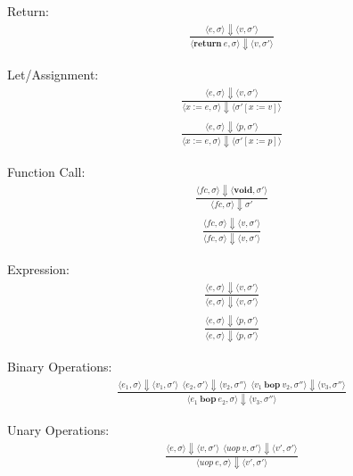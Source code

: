 \documentclass[12pt]{article}
\begin{document}
	Return:
	\begin{align*}
		\frac{\langle e, \sigma \rangle\Downarrow \langle v, \sigma' \rangle}
		{\langle \textbf{return}\ e, \sigma \rangle\Downarrow \langle v, \sigma' \rangle}
	\end{align*}

	Let/Assignment:
	\begin{align*}
		\frac{\langle e, \sigma \rangle\Downarrow \langle v, \sigma' \rangle}
		{\langle x := e, \sigma \rangle\Downarrow \langle \sigma' [x := v] \rangle}
	\end{align*}
	\begin{align*}
		\frac{\langle e, \sigma \rangle\Downarrow \langle p, \sigma' \rangle}
		{\langle x := e, \sigma \rangle\Downarrow \langle \sigma' [x := p] \rangle}
	\end{align*}

	Function Call:
	\begin{align*}
		\frac{\langle fc, \sigma \rangle\Downarrow \langle \textbf{void}, \sigma' \rangle}
		{\langle fc, \sigma \rangle\Downarrow \sigma'}
	\end{align*}
	\begin{align*}
		\frac{\langle fc, \sigma \rangle\Downarrow \langle v, \sigma' \rangle}
		{\langle fc, \sigma \rangle\Downarrow \langle v, \sigma' \rangle}
	\end{align*}

	Expression:
	\begin{align*}
		\frac{\langle e, \sigma \rangle\Downarrow \langle v, \sigma' \rangle}
		{\langle e, \sigma \rangle\Downarrow \langle v, \sigma' \rangle}
	\end{align*}
	\begin{align*}
		\frac{\langle e, \sigma \rangle\Downarrow \langle p, \sigma' \rangle}
		{\langle e, \sigma \rangle\Downarrow \langle p, \sigma' \rangle}
	\end{align*}

	Binary Operations:
	\begin{align*}
		\frac{\langle e_1, \sigma \rangle\Downarrow \langle v_1, \sigma' \rangle \ \
		\langle e_2, \sigma' \rangle\Downarrow \langle v_2, \sigma'' \rangle \ \
		\langle v_1\ \textbf{bop}\ v_2, \sigma'' \rangle\Downarrow \langle v_3, \sigma'' \rangle}
		{\langle e_1\ \textbf{bop}\ e_2, \sigma \rangle\Downarrow \langle v_3, \sigma'' \rangle}
	\end{align*}
	
	Unary Operations:
	\begin{align*}
		\frac{\langle e, \sigma \rangle\Downarrow \langle v, \sigma' \rangle \ \
		\langle uop\ v, \sigma' \rangle\Downarrow \langle v', \sigma' \rangle}
		{\langle uop\ e, \sigma \rangle\Downarrow \langle v', \sigma' \rangle}
	\end{align*}
\end{document}
